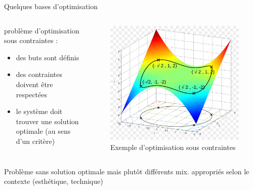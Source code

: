 \documentclass[9pt, aspectratio=169]{beamer}
\begin{document}
\begin{frame}{Quelques bases d'optimisation} %
\begin{columns}
    \begin{column}{0.63\textwidth}
problème d'optimisation sous contraintes :
\begin{itemize}
	\item des buts sont définis
	\item des contraintes doivent être respectées
	\item le système doit trouver une solution optimale (au sens d'un critère)
\end{itemize}
	\end{column}
    \begin{column}{0.35\textwidth}
    
    \begin{figure}
    	\includegraphics[width=\textwidth]{fig/lagrange_multiplier.jpg}
    	\caption{Exemple d'optimisation sous contraintes}
    \end{figure}

    \end{column}
\end{columns}

Problème sans solution optimale mais plutôt différents mix. appropriés selon le contexte (esthétique, technique) \cite{jillings_automatic_2017}

\end{frame}
\end{document}
